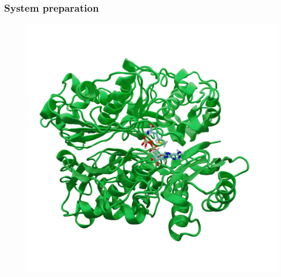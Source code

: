 \documentclass{beamer}
\begin{document}
\begin{frame}
\frametitle{System preparation}
\begin{figure}
\centering 
\includegraphics[scale=0.2]{figures/mat2a-equil.png}
\end{figure}
\end{frame}
\end{document}
